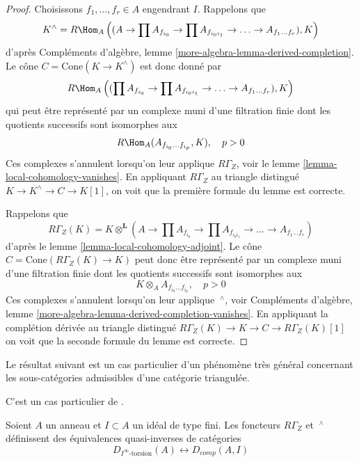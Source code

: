 \begin{proof}
Choisissons $f_1, \ldots, f_r \in A$ engendrant $I$. Rappelons que
$$
K^\wedge = R\Hom_A\left((A \to \prod A_{f_{i_0}}
\to \prod A_{f_{i_0i_1}} \to \ldots \to A_{f_1 \ldots f_r}), K\right)
$$
d'après Compléments d'algèbre, lemme \ref{more-algebra-lemma-derived-completion}.
Le cône $C = \text{Cone}(K \to K^\wedge)$ est donc donné par
$$
R\Hom_A\left((\prod A_{f_{i_0}}
\to \prod A_{f_{i_0i_1}} \to \ldots \to A_{f_1 \ldots f_r}), K\right)
$$
qui peut être représenté par un complexe muni d'une filtration finie
dont les quotients successifs sont isomorphes aux
$$
R\Hom_A(A_{f_{i_0} \ldots f_{i_p}}, K), \quad p > 0
$$
Ces complexes s'annulent lorsqu'on leur applique $R\Gamma_Z$,
voir le lemme \ref{lemma-local-cohomology-vanishes}. En appliquant $R\Gamma_Z$
au triangle distingué $K \to K^\wedge \to C \to K[1]$,
on voit que la première formule du lemme est correcte.

\medskip\noindent
Rappelons que
$$
R\Gamma_Z(K) =
K \otimes^\mathbf{L} (A \to \prod A_{f_{i_0}}
\to \prod A_{f_{i_0i_1}} \to \ldots \to A_{f_1 \ldots f_r})
$$
d'après le lemme \ref{lemma-local-cohomology-adjoint}.
Le cône $C = \text{Cone}(R\Gamma_Z(K) \to K)$ peut donc être représenté par un complexe muni
d'une filtration finie dont les quotients successifs sont isomorphes aux
$$
K \otimes_A A_{f_{i_0} \ldots f_{i_p}}, \quad p > 0
$$
Ces complexes s'annulent lorsqu'on leur applique ${\ }^\wedge$,
voir Compléments d'algèbre, lemme \ref{more-algebra-lemma-derived-completion-vanishes}.
En appliquant la complétion dérivée au triangle distingué
$R\Gamma_Z(K) \to K \to C \to R\Gamma_Z(K)[1]$
on voit que la seconde formule du lemme est correcte.
\end{proof}

\noindent
Le résultat suivant est un cas particulier d'un phénomène très général
concernant les sous-catégories admissibles d'une catégorie triangulée.

\begin{proposition}
\label{proposition-torsion-complete}
\begin{reference}
C'est un cas particulier de \cite[théorème 1.1]{Porta-Liran-Yekutieli}.
\end{reference}
Soient $A$ un anneau et $I \subset A$ un idéal de type fini.
Les foncteurs $R\Gamma_Z$ et ${\ }^\wedge$ définissent des équivalences
quasi-inverses de catégories
$$
D_{I^\infty\text{-torsion}}(A) \leftrightarrow D_{comp}(A, I)
$$
\end{proposition}

